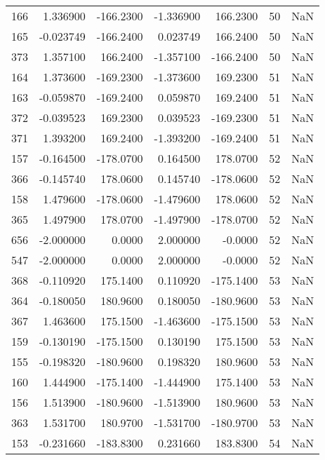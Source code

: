 \begin{tabular}{rrrrrrr}
 166 &    1.336900 & -166.2300 &   -1.336900 &    166.2300 &          50 & NaN \\
 165 &   -0.023749 & -166.2400 &    0.023749 &    166.2400 &          50 & NaN \\
 373 &    1.357100 &  166.2400 &   -1.357100 &   -166.2400 &          50 & NaN \\
 164 &    1.373600 & -169.2300 &   -1.373600 &    169.2300 &          51 & NaN \\
 163 &   -0.059870 & -169.2400 &    0.059870 &    169.2400 &          51 & NaN \\
 372 &   -0.039523 &  169.2300 &    0.039523 &   -169.2300 &          51 & NaN \\
 371 &    1.393200 &  169.2400 &   -1.393200 &   -169.2400 &          51 & NaN \\
 157 &   -0.164500 & -178.0700 &    0.164500 &    178.0700 &          52 & NaN \\
 366 &   -0.145740 &  178.0600 &    0.145740 &   -178.0600 &          52 & NaN \\
 158 &    1.479600 & -178.0600 &   -1.479600 &    178.0600 &          52 & NaN \\
 365 &    1.497900 &  178.0700 &   -1.497900 &   -178.0700 &          52 & NaN \\
 656 &   -2.000000 &    0.0000 &    2.000000 &     -0.0000 &          52 & NaN \\
 547 &   -2.000000 &    0.0000 &    2.000000 &     -0.0000 &          52 & NaN \\
 368 &   -0.110920 &  175.1400 &    0.110920 &   -175.1400 &          53 & NaN \\
 364 &   -0.180050 &  180.9600 &    0.180050 &   -180.9600 &          53 & NaN \\
 367 &    1.463600 &  175.1500 &   -1.463600 &   -175.1500 &          53 & NaN \\
 159 &   -0.130190 & -175.1500 &    0.130190 &    175.1500 &          53 & NaN \\
 155 &   -0.198320 & -180.9600 &    0.198320 &    180.9600 &          53 & NaN \\
 160 &    1.444900 & -175.1400 &   -1.444900 &    175.1400 &          53 & NaN \\
 156 &    1.513900 & -180.9600 &   -1.513900 &    180.9600 &          53 & NaN \\
 363 &    1.531700 &  180.9700 &   -1.531700 &   -180.9700 &          53 & NaN \\
 153 &   -0.231660 & -183.8300 &    0.231660 &    183.8300 &          54 & NaN \\

\end{tabular}
